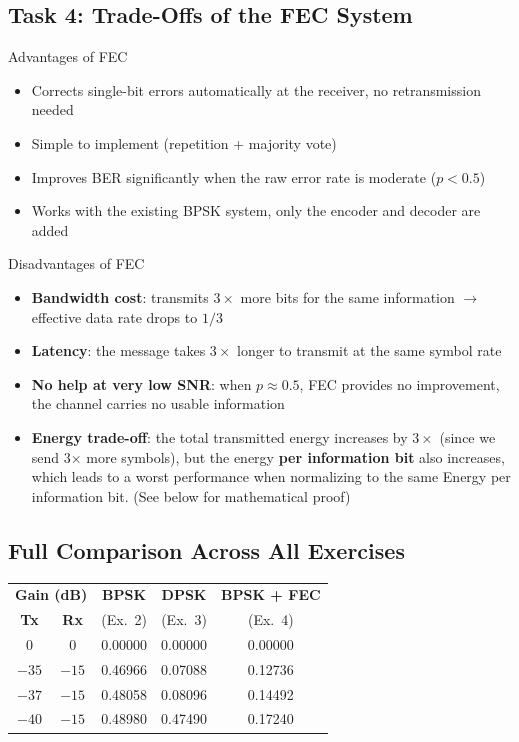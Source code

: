 \vspace{1cm}

\subsection{Task 4: Trade-Offs of the FEC System}

\begin{KeyBox}{Advantages of FEC}
\begin{itemize}
\item Corrects single-bit errors automatically at the receiver, no retransmission needed
\item Simple to implement (repetition + majority vote)
\item Improves BER significantly when the raw error rate is moderate ($p < 0.5$)
\item Works with the existing BPSK system, only the encoder and decoder are added
\end{itemize}
\end{KeyBox}

\begin{KeyBox}{Disadvantages of FEC}
\begin{itemize}
\item \textbf{Bandwidth cost}: transmits $3\times$ more bits for the same information $\rightarrow$ effective data rate drops to $1/3$
\item \textbf{Latency}: the message takes $3\times$ longer to transmit at the same symbol rate
\item \textbf{No help at very low SNR}: when $p \approx 0.5$, FEC provides no improvement, the channel carries no usable information
\item \textbf{Energy trade-off}: the total transmitted energy increases by $3\times$ (since we send 3$\times$ more symbols), but the energy \textbf{per information bit} also increases, which leads to a worst performance when normalizing to the same Energy per information bit. (See below for mathematical proof)
\end{itemize}
\end{KeyBox}

\subsection{Full Comparison Across All Exercises}

\begin{center}
\renewcommand{\arraystretch}{1.4}
\begin{tabular}{cc|c|c|c}
\hline
\multicolumn{2}{c|}{\textbf{Gain (dB)}} & \textbf{BPSK} & \textbf{DPSK} & \textbf{BPSK + FEC} \\
\textbf{Tx} & \textbf{Rx} & (Ex.\ 2) & (Ex.\ 3) & (Ex.\ 4) \\
\hline
0 & 0 & 0.00000 & 0.00000 & 0.00000 \\
$-35$ & $-15$ & 0.46966 & 0.07088 & 0.12736 \\
$-37$ & $-15$ & 0.48058 & 0.08096 & 0.14492 \\
$-40$ & $-15$ & 0.48980 & 0.47490 & 0.17240 \\
\hline
\end{tabular}
\end{center}

